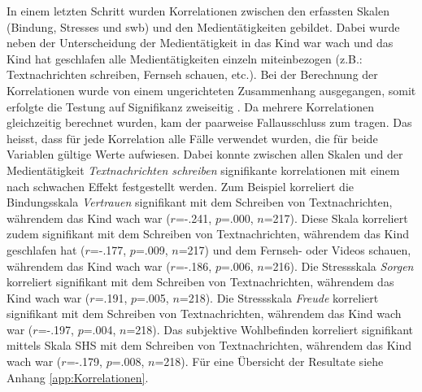 In einem letzten Schritt wurden Korrelationen zwischen den erfassten Skalen (Bindung, Stresses und \acrshort{swb}) und den Medientätigkeiten gebildet. Dabei wurde neben der Unterscheidung der Medientätigkeit in das Kind war wach und das Kind hat geschlafen alle Medientätigkeiten einzeln miteinbezogen (z.B.: Textnachrichten schreiben, Fernseh schauen, etc.).  Bei der Berechnung der Korrelationen wurde von einem ungerichteten Zusammenhang ausgegangen, somit erfolgte die Testung auf Signifikanz zweiseitig \cite{UniversitatZurich2018}. Da mehrere Korrelationen gleichzeitig berechnet wurden, kam der paarweise Fallausschluss zum tragen. Das heisst, dass für jede Korrelation alle Fälle verwendet wurden, die für beide Variablen gültige Werte aufwiesen. Dabei konnte zwischen allen Skalen und der Medientätigkeit \textit{Textnachrichten schreiben} signifikante korrelationen mit einem nach  schwachen Effekt festgestellt werden. Zum Beispiel korreliert die Bindungsskala \textit{Vertrauen} signifikant mit dem Schreiben von Textnachrichten, währendem das Kind wach war ($r$=-.241, $p$=.000, $n$=217). Diese Skala korreliert zudem signifikant mit dem Schreiben von Textnachrichten, währendem das Kind geschlafen hat ($r$=-.177, $p$=.009, $n$=217) und dem Fernseh- oder Videos schauen, währendem das Kind wach war ($r$=-.186, $p$=.006, $n$=216). Die Stressskala \textit{Sorgen} korreliert signifikant mit dem Schreiben von Textnachrichten, währendem das Kind wach war ($r$=.191, $p$=.005, $n$=218). Die Stressskala \textit{Freude} korreliert signifikant mit dem Schreiben von Textnachrichten, währendem das Kind wach war ($r$=-.197, $p$=.004, $n$=218). Das subjektive Wohlbefinden korreliert signifikant mittels Skala SHS mit dem Schreiben von Textnachrichten, währendem das Kind wach war ($r$=-.179, $p$=.008, $n$=218). Für eine Übersicht der Resultate siehe Anhang \ref{app:Korrelationen}.




